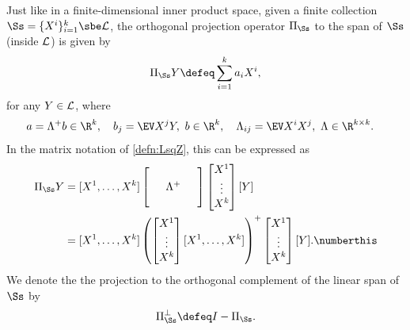 \documentclass[main.tex]{subfiles}
\begin{document}
\begin{fact}\label{fact:LsqProjection}
Just like in a finite-dimensional inner product space, given a finite collection $\Ss = \{X^i\}_{i=1}^k \sbe \LsqZ$, the orthogonal projection operator $\Pi_\Ss$ to the span of $\Ss$ (inside $\mathcal{L}$) is given by
\[\Pi_\Ss Y \defeq \sum_{i=1}^k a_i X^i,
\]
for any $Y \in \mathcal{L}$, where
\begin{align*}
a &= \Lambda^+ b \in \R^k,\quad
b_j = \EV X^j Y,\ b \in \R^k,\quad
\Lambda_{ij} = \EV X^i X^j,\ \Lambda \in \R^{k \times k}.
\end{align*}
In the matrix notation of \cref{defn:LsqZ}, this can be expressed as
\begin{align*}
\Pi_\Ss Y
  &=
    [X^1, \ldots, X^k]
    \begin{bmatrix}
    \phz
      &\phz
        &\phz\\
    \phz
      &\Lambda^+
        &\phz\\
    \phz
      &\phz
        &\phz
    \end{bmatrix}
    \begin{bmatrix}
    X^1\\
    \vdots\\
    X^k
    \end{bmatrix}
    [Y]
    \\
  &=
    [X^1, \ldots, X^k]
    \left(
      \begin{bmatrix}
      X^1\\
      \vdots\\
      X^k
      \end{bmatrix}
      [X^1, \ldots, X^k]
    \right)^+
    \begin{bmatrix}
      X^1\\
      \vdots\\
      X^k
    \end{bmatrix}
    [Y]
    .
    \numberthis\label{eqn:matrixformProjection}
\end{align*}
We denote the the projection to the orthogonal complement of the linear span of $\Ss$ by
\[\Pi_\Ss^\perp \defeq I - \Pi_\Ss.\]

\end{fact}
\end{document}
